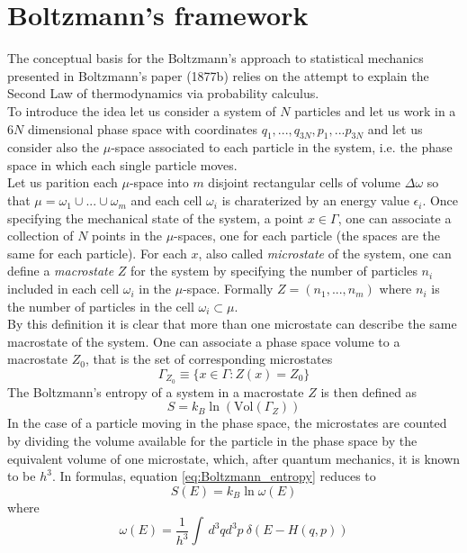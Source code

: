 \section{Boltzmann's framework}
The conceptual basis for the Boltzmann's approach to statistical mechanics presented in Boltzmann's paper (1877b) relies on the attempt to explain the Second Law of thermodynamics via probability calculus. \\
To introduce the idea let us consider a system of $N$ particles and let us work in a $6N$ dimensional phase space with coordinates $q_1,...,q_{3N}, p_1, ... p_{3N}$ and let us consider also the $\mu$-space associated to each particle in the system, i.e. the phase space in which each single particle moves. \\
Let us parition each $\mu$-space into $m$ disjoint rectangular cells of volume $\Delta\omega$ so that $\mu = \omega_1 \cup ... \cup \omega_m$ and each cell $\omega_i$ is charaterized by an energy value $\epsilon_i$. Once specifying the mechanical state of the system, a point $x \in \Gamma$, one can 
associate a collection of $N$ points in the $\mu$-spaces, one for each particle (the spaces are the same for each particle). For each $x$, also called \emph{microstate} of the system, one can define a \emph{macrostate} $Z$ for the system by specifying the number of particles $n_i$ included in each cell $\omega_i$ in the $\mu$-space. 
Formally $Z = (n_1, ... , n_m)$ where $n_i$ is the number of particles in the cell $\omega_i \subset \mu$. \\
By this definition it is clear that more than one microstate can describe the same macrostate of the system. One can associate a phase space volume to a macrostate $Z_0$, that is the set of corresponding microstates
\begin{equation*}
    \Gamma_{Z_0} \equiv \{x \in \Gamma : Z(x) = Z_0\}
\end{equation*}
The Boltzmann's entropy of a system in a macrostate $Z$ is then defined as
\begin{equation}
    S = k_B \ln\left( \text{Vol}(\Gamma_Z)\right)
    \label{eq:Boltzmann_entropy}
\end{equation}
In the case of a particle moving in the phase space, the microstates are counted by dividing the volume available for the particle in the phase space by the equivalent volume of one microstate, which, after quantum mechanics, it is known to be $h^3$.
In formulas, equation \ref{eq:Boltzmann_entropy} reduces to
\begin{equation*}
    S(E) = k_B \ln \omega(E)
\end{equation*}
where
\begin{equation*}
    \omega(E) = \frac{1}{h^3} \int \, d^3qd^3p \ \delta(E - H(q, p))
\end{equation*}
